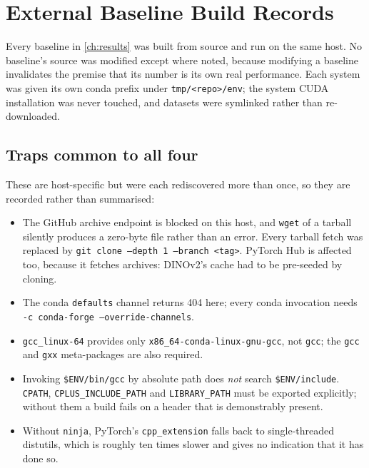 \chapter{External Baseline Build Records}
\label{app:baselines}

Every baseline in \cref{ch:results} was built from source and run on the same
host. No baseline's source was modified except where noted, because modifying
a baseline invalidates the premise that its number is its own real
performance. Each system was given its own conda prefix under
\texttt{tmp/<repo>/env}; the system CUDA installation was never touched, and
datasets were symlinked rather than re-downloaded.

\section{Traps common to all four}

These are host-specific but were each rediscovered more than once, so they are
recorded rather than summarised:

\begin{itemize}\itemsep2pt
\item The GitHub archive endpoint is blocked on this host, and
      \texttt{wget} of a tarball silently produces a zero-byte file rather
      than an error. Every tarball fetch was replaced by
      \texttt{git clone --depth 1 --branch <tag>}. PyTorch Hub is affected too,
      because it fetches archives: DINOv2's cache had to be pre-seeded by
      cloning.
\item The conda \texttt{defaults} channel returns 404 here; every conda
      invocation needs \texttt{-c conda-forge --override-channels}.
\item \texttt{gcc\_linux-64} provides only
      \texttt{x86\_64-conda-linux-gnu-gcc}, not \texttt{gcc}; the \texttt{gcc}
      and \texttt{gxx} meta-packages are also required.
\item Invoking \texttt{\$ENV/bin/gcc} by absolute path does \emph{not} search
      \texttt{\$ENV/include}. \texttt{CPATH}, \texttt{CPLUS\_INCLUDE\_PATH} and
      \texttt{LIBRARY\_PATH} must be exported explicitly; without them a build
      fails on a header that is demonstrably present.
\item Without \texttt{ninja}, PyTorch's \texttt{cpp\_extension} falls back to
      single-threaded distutils, which is roughly ten times slower and gives
      no indication that it has done so.
\end{itemize}


